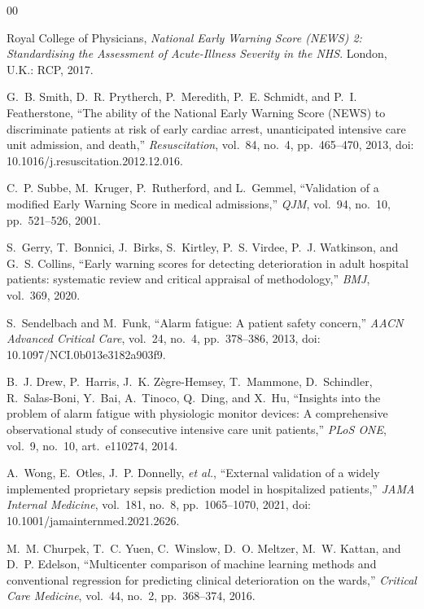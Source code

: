 \documentclass[lettersize,journal]{IEEEtran}
\begin{document}
\begin{thebibliography}{00}

Royal College of Physicians, \emph{National Early Warning Score (NEWS) 2:
Standardising the Assessment of Acute-Illness Severity in the NHS}. London,
U.K.: RCP, 2017.

G.~B. Smith, D.~R. Prytherch, P.~Meredith, P.~E. Schmidt, and P.~I.
Featherstone, ``The ability of the National Early Warning Score (NEWS) to
discriminate patients at risk of early cardiac arrest, unanticipated intensive
care unit admission, and death,'' \emph{Resuscitation}, vol.~84, no.~4,
pp.~465--470, 2013, doi: 10.1016/j.resuscitation.2012.12.016.

C.~P. Subbe, M.~Kruger, P.~Rutherford, and L.~Gemmel, ``Validation of a modified
Early Warning Score in medical admissions,'' \emph{QJM}, vol.~94, no.~10,
pp.~521--526, 2001.

S.~Gerry, T.~Bonnici, J.~Birks, S.~Kirtley, P.~S. Virdee, P.~J. Watkinson, and
G.~S. Collins, ``Early warning scores for detecting deterioration in adult
hospital patients: systematic review and critical appraisal of methodology,''
\emph{BMJ}, vol.~369, 2020.

S.~Sendelbach and M.~Funk, ``Alarm fatigue: A patient safety concern,''
\emph{AACN Advanced Critical Care}, vol.~24, no.~4, pp.~378--386, 2013, doi:
10.1097/NCI.0b013e3182a903f9.

B.~J. Drew, P.~Harris, J.~K. Z\`{e}gre-Hemsey, T.~Mammone, D.~Schindler,
R.~Salas-Boni, Y.~Bai, A.~Tinoco, Q.~Ding, and X.~Hu, ``Insights into the
problem of alarm fatigue with physiologic monitor devices: A comprehensive
observational study of consecutive intensive care unit patients,''
\emph{PLoS ONE}, vol.~9, no.~10, art.~e110274, 2014.

A.~Wong, E.~Otles, J.~P. Donnelly, \emph{et al.}, ``External validation of a
widely implemented proprietary sepsis prediction model in hospitalized
patients,'' \emph{JAMA Internal Medicine}, vol.~181, no.~8, pp.~1065--1070,
2021, doi: 10.1001/jamainternmed.2021.2626.

M.~M. Churpek, T.~C. Yuen, C.~Winslow, D.~O. Meltzer, M.~W. Kattan, and D.~P.
Edelson, ``Multicenter comparison of machine learning methods and conventional
regression for predicting clinical deterioration on the wards,'' \emph{Critical
Care Medicine}, vol.~44, no.~2, pp.~368--374, 2016.


\end{thebibliography}
\end{document}
